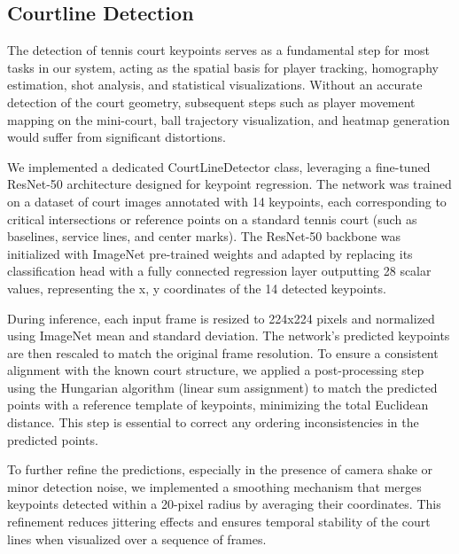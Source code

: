 \subsection{Courtline Detection}

The detection of tennis court keypoints serves as a fundamental step for most tasks in our system, acting as the spatial basis for player tracking, homography estimation, shot analysis, and statistical visualizations. 
Without an accurate detection of the court geometry, subsequent steps such as player movement mapping on the mini-court, ball trajectory visualization, and heatmap generation would suffer from significant distortions.

We implemented a dedicated CourtLineDetector class, leveraging a fine-tuned ResNet-50 architecture designed for keypoint regression. 
The network was trained on a dataset of court images annotated with 14 keypoints, each corresponding to critical intersections or reference points on a standard tennis court (such as baselines, service lines, and center marks).
The ResNet-50 backbone was initialized with ImageNet pre-trained weights and adapted by replacing its classification head with a fully connected regression layer outputting 28 scalar values, representing the x, y coordinates of the 14 detected keypoints.


During inference, each input frame is resized to 224x224 pixels and normalized using ImageNet mean and standard deviation. 
The network's predicted keypoints are then rescaled to match the original frame resolution. 
To ensure a consistent alignment with the known court structure, we applied a post-processing step using the Hungarian algorithm (linear sum assignment) to match the predicted points with a reference template of keypoints, minimizing the total Euclidean distance. 
This step is essential to correct any ordering inconsistencies in the predicted points.

To further refine the predictions, especially in the presence of camera shake or minor detection noise, we implemented a smoothing mechanism that merges keypoints detected within a 20-pixel radius by averaging their coordinates. 
This refinement reduces jittering effects and ensures temporal stability of the court lines when visualized over a sequence of frames.

